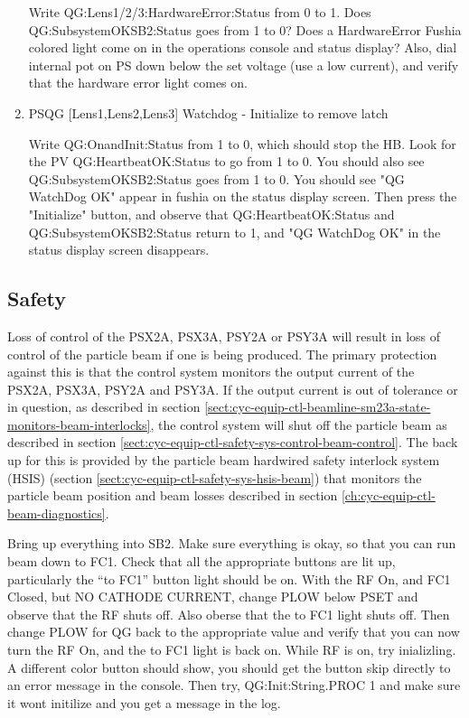 \documentclass[11pt]{book}		%
\begin{document}
\begin{enumerate}
\color{red}
Write QG:Lens1/2/3:HardwareError:Status from 0 to 1. Does QG:SubsystemOKSB2:Status goes from 1 to 0? Does a HardwareError Fushia colored light come on in the operations console and status display? Also, dial internal pot on PS down below the set voltage (use a low current), and verify that the hardware error light comes on.
\color{black}

 \item PSQG [Lens1,Lens2,Lens3] Watchdog - Initialize to remove latch

\color{red}
Write QG:OnandInit:Status from 1 to 0, which should stop the HB. Look for the PV QG:HeartbeatOK:Status to go from 1 to 0. You should also see QG:SubsystemOKSB2:Status goes from 1 to 0. You should see "QG WatchDog OK" appear in fushia on the status display screen. Then press the "Initialize" button, and observe that QG:HeartbeatOK:Status and QG:SubsystemOKSB2:Status return to 1, and "QG WatchDog OK" in the status display screen disappears.
\color{black}

\end{enumerate}


\subsection{Safety}\label{sect:cyc-equip-ctl-beamline-sm23a-safety}

Loss of control of the PSX2A, PSX3A, PSY2A or PSY3A will result in loss of control of the particle beam if one is being produced.  The primary protection against this is that the control system monitors the output current of the PSX2A, PSX3A, PSY2A and PSY3A.  If the output current is out of tolerance or in question, as described in section \ref{sect:cyc-equip-ctl-beamline-sm23a-state-monitors-beam-interlocks}, the control system will shut off the particle beam as described in section \ref{sect:cyc-equip-ctl-safety-sys-control-beam-control}.  The back up for this is provided by the particle beam hardwired safety interlock system (HSIS) (section \ref{sect:cyc-equip-ctl-safety-sys-hsis-beam}) that monitors the particle beam position and beam losses described in section \ref{ch:cyc-equip-ctl-beam-diagnostics}.


\color{red}

Bring up everything into SB2. Make sure everything is okay, so that you can run beam down to FC1. Check that all the appropriate buttons are lit up, particularly the ``to FC1'' button light should be on. With the RF On, and FC1 Closed, but NO CATHODE CURRENT, change PLOW below PSET and observe that the RF shuts off. Also oberse that the to FC1 light shuts off. Then change PLOW for QG back to the appropriate value and verify that you can now turn the RF On, and the to FC1 light is back on. While RF is on, try inializling. A different color button should show, you should get the button skip directly to an error message in the console. Then try, QG:Init:String.PROC 1 and make sure it wont initilize and you get a message in the log.
\end{document}
